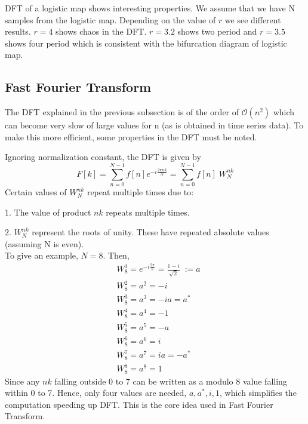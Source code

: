 \documentclass[11pt]{article}
\begin{document}
            DFT of a logistic map shows interesting properties. We assume that we have N samples from the logistic map. Depending on the value of $r$ we see different results. $r=4$ shows chaos in the DFT. $r=3.2$ shows two period and $r=3.5$ shows four period which is consistent with the bifurcation diagram of logistic map. 

         \subsection{Fast Fourier Transform}
            The DFT explained in the previous subsection is of the order of $\mathcal{O}(n^2)$ which can become very slow of large values for n (as is obtained in time series data). To make this more efficient, some properties in the DFT must be noted.

            Ignoring normalization constant, the DFT is given by 
            $$
               F[k] = \sum_{n=0}^{N-1} f[n] e^{-i\frac{ 2\pi n k }{N}} = \sum_{n=0}^{N-1} f[n] \; W_N^{nk}
            $$
            Certain values of $W_N^{nk}$ repeat multiple times due to:

            1. The value of product $nk$ repeats multiple times.

            2. $W_N^{nk}$ represent the roots of unity. These have repeated absolute values (assuming N is even). \\[5mm]
            To give an example, $N=8$. Then,
            \begin{align*}
              & W_8^1 = e^{-i\frac{2\pi}{8}} = \frac{1 - i}{\sqrt{2}} \; := a \\
               &W_8^2 = a^2 = -i \\
               &W_8^3 = a^3 = -i a = a^* \\
               &W_8^4 = a^4 = -1 \\
               &W_8^5 = a^5 = -a \\
               &W_8^6 = a^6 = i \\
               &W_8^7 = a^7 = i a = -a^* \\
               &W_8^8 = a^8 = 1
            \end{align*}
            Since any $nk$ falling outside 0 to 7 can be written as a modulo 8 value falling within 0 to 7. Hence, only four values are needed, $a, a^*, i, 1$, which simplifies the computation speeding up DFT. This is the core idea used in Fast Fourier Transform. 
            
\end{document}
